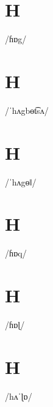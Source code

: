 \documentclass[10pt,a4paper,twoside]{book}
\begin{document}
\section*{H}

\begin{multicols}{3}
 {/ɦɒg/} {}
\end{multicols}

\section*{H}

\begin{multicols}{3}
 {/ˈhʌgbɵt͡sʌ/} {}
\end{multicols}

\section*{H}

\begin{multicols}{3}
 {/ˈhʌgɵǁ/} {}
\end{multicols}

\section*{H}

\begin{multicols}{3}
 {/ɦɒq/} {}
\end{multicols}

\section*{H}

\begin{multicols}{3}
 {/ɦɒɭ/} {}
\end{multicols}

\section*{H}

\begin{multicols}{3}
 {/hʌˈɭɒ/} {}
\end{multicols}
\end{document}
